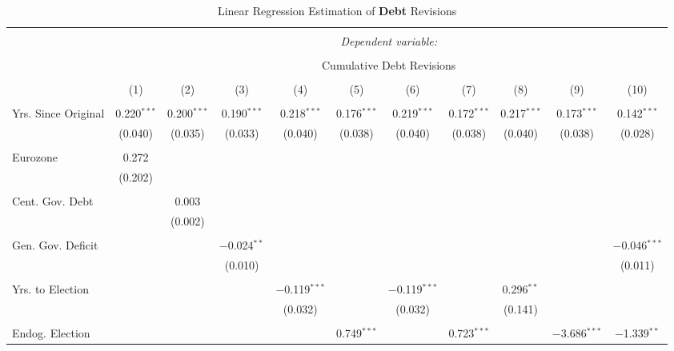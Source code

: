 
\begin{table}[!htbp] \centering 
  \caption{Linear Regression Estimation of \textbf{Debt} Revisions} 
  \label{debt_results} 
\tiny 
\begin{tabular}{@{\extracolsep{5pt}}lcccccccccc} 
\\[-1.8ex]\hline 
\hline \\[-1.8ex] 
 & \multicolumn{10}{c}{\textit{Dependent variable:}} \\ 
\cline{2-11} 
\\[-1.8ex] & \multicolumn{10}{c}{Cumulative Debt Revisions} \\ 
\\[-1.8ex] & (1) & (2) & (3) & (4) & (5) & (6) & (7) & (8) & (9) & (10)\\ 
\hline \\[-1.8ex] 
 Yrs. Since Original & 0.220$^{***}$ & 0.200$^{***}$ & 0.190$^{***}$ & 0.218$^{***}$ & 0.176$^{***}$ & 0.219$^{***}$ & 0.172$^{***}$ & 0.217$^{***}$ & 0.173$^{***}$ & 0.142$^{***}$ \\ 
  & (0.040) & (0.035) & (0.033) & (0.040) & (0.038) & (0.040) & (0.038) & (0.040) & (0.038) & (0.028) \\ 
  & & & & & & & & & & \\ 
 Eurozone & 0.272 &  &  &  &  &  &  &  &  &  \\ 
  & (0.202) &  &  &  &  &  &  &  &  &  \\ 
  & & & & & & & & & & \\ 
 Cent. Gov. Debt &  & 0.003 &  &  &  &  &  &  &  &  \\ 
  &  & (0.002) &  &  &  &  &  &  &  &  \\ 
  & & & & & & & & & & \\ 
 Gen. Gov. Deficit &  &  & $-$0.024$^{**}$ &  &  &  &  &  &  & $-$0.046$^{***}$ \\ 
  &  &  & (0.010) &  &  &  &  &  &  & (0.011) \\ 
  & & & & & & & & & & \\ 
 Yrs. to Election &  &  &  & $-$0.119$^{***}$ &  & $-$0.119$^{***}$ &  & 0.296$^{**}$ &  &  \\ 
  &  &  &  & (0.032) &  & (0.032) &  & (0.141) &  &  \\ 
  & & & & & & & & & & \\ 
 Endog. Election &  &  &  &  & 0.749$^{***}$ &  & 0.723$^{***}$ &  & $-$3.686$^{***}$ & $-$1.339$^{**}$ \\ 

\end{tabular}
\end{table}
